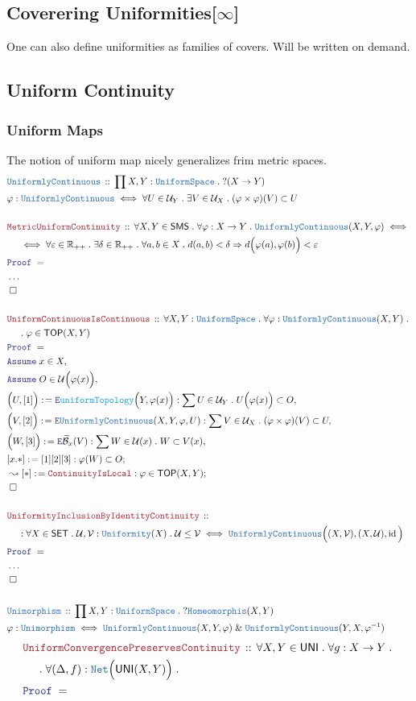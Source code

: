 \documentclass[12pt]{scrartcl}
\newcommand{\TYPE}[1]{\textcolor{NavyBlue}{\mathtt{#1}}}
\newcommand{\FUNC}[1]{\textcolor{Cerulean}{\mathtt{#1}}}
\newcommand{\LOGIC}[1]{\textcolor{Blue}{\mathtt{#1}}}
\newcommand{\THM}[1]{\textcolor{Maroon}{\mathtt{#1}}}
\renewcommand{\.}{\; . \;}
\newcommand{\de}{: \kern 0.1pc =}
\newcommand{\Theorem}[2]{& \THM{#1} \, :: \, #2 \\ & \Proof = \\ }
\newcommand{\DeclareType}[2]{& \TYPE{#1} \, :: \, #2 \\}
\newcommand{\DefineType}[3]{& #1 : \TYPE{#2} \iff #3 \\}
\newcommand{\NewLine}{\\ & \kern 1pc}
\newcommand{\Page}[1]{ \begin{align*} #1 \end{align*}   }
\newcommand{\NoProof}{ & \ldots \\ \EndProof}
\renewcommand{\And}{\; \& \;}
\newcommand{\Imply}{\Rightarrow}
\newcommand{\Reals}{\mathbb{R} }
\DeclareMathOperator*{\id}{id}
\newcommand{\Say}[3]{& #1 \de #2 : #3, \\}
\newcommand{\Conclude}[3]{& #1 \de #2 : #3; \\}
\newcommand{\DeriveConclude}[3]{& \leadsto #1 \de #2 : #3 ; \\}
\newcommand{\AssumeIn}[2]{& \LOGIC{Assume} \; #1 \in #2, \\}
\newcommand{\Elim}{\LOGIC{E}}
\newcommand{\QED}{\; \square}
\newcommand{\EndProof}{& \QED \\}
\newcommand{\Proof}{\LOGIC{Proof} \; }
\newcommand{\B}{\mathcal{B}}
\newcommand{\SET}{\mathsf{SET}}
\newcommand{\Net}{\TYPE{Net}}
\newcommand{\TOP}{\mathsf{TOP}}
\renewcommand{\U}{\mathcal{U}}
\newcommand{\SMS}{\mathsf{SMS}}
\newcommand{\UNI}{\mathsf{UNI}}
\newcommand{\Unif}{\TYPE{Uniformity}}
\newcommand{\US}{\TYPE{UniformSpace}}
\newcommand{\UC}{\TYPE{UniformlyContinuous}}
\newcommand{\UHomeo}{\TYPE{Unimorphism}}
\newcommand{\V}{\mathcal{V}}
\begin{document}
\subsection{Coverering Uniformities[$\infty$]}
One can also define uniformities as families of covers.
Will be written on demand.
\newpage
\subsection{Uniform Continuity}
\subsubsection{Uniform Maps}
The notion of uniform map nicely generalizes frim metric spaces.
\Page{
	\DeclareType{\UC}{\prod X,Y : \US \. ?(X \to Y)}
	\DefineType{\varphi}{\UC}{
		\forall U \in \U_Y \. 
		\exists V \in \U_X \.
		(\varphi \times \varphi)(V) \subset U 
	}
	\\
	\Theorem{MetricUniformContinuity}
	{
		\forall X,Y \in \SMS \.
		\forall \varphi : X \to Y \.
		\UC(X,Y,\varphi)
		\iff \NewLine \iff
		\forall \varepsilon \in \Reals_{++} \.
		\exists \delta \in \Reals_{++} \.
		\forall a,b \in X \.
		d(a,b) < \delta \Imply  d\Big( \varphi(a), \varphi(b)\Big) < \varepsilon  
	}
	\NoProof
	\\
	\Theorem{UniformContinuousIsContinuous}
	{
		\forall X,Y : \US \.
		\forall \varphi : \UC(X,Y) \. \NewLine \.
		\varphi \in \TOP(X,Y)
	}
	\AssumeIn{x}{X}
	\AssumeIn{O}{\U\Big( \varphi(x)\Big)}
	\Say{\Big(U,[1]\Big)}{\Elim \FUNC{uniformTopology}\Big(Y, \varphi(x)\Big)}
	{
		\sum U \in \U_Y \. U\Big( \varphi(x) \Big)  \subset O
	}
	\Say{\Big(V,[2]\Big)}{\Elim \UC(X,Y,\varphi,U) }
	{
		\sum V \in \U_X \. (\varphi \times \varphi)(V) \subset U
	}
	\Say{\Big(W,[3]\Big)}{\Elim \widetilde{\B}_x(V)}
	{
		\sum W \in \U(x) \.   W \subset V(x)
	}
	\Conclude{[x.*]}{[1][2][3]}{\varphi(W) \subset O}
	\DeriveConclude{[*]}{\THM{ContinuityIsLocal}}
	{
		\varphi \in \TOP(X,Y)	
	}
	\EndProof	
	\\
	\Theorem{UniformityInclusionByIdentityContinuity}
	{
		\NewLine :
		\forall X \in \SET \.
		\U,\V : \Unif(X)  \.
		\U \le \V
		\iff
		\UC\Big((X,\V),(X,\U),\id\Big)	
	}
	\NoProof
	\\
	\DeclareType{\UHomeo}{\prod X,Y : \US \. ?\TYPE{Homeomorphis}(X,Y)}
	\DefineType{\varphi}{\UHomeo}
	{
		\UC(X,Y,\varphi) \And \UC(Y,X,\varphi^{-1})
	}
}\Page{
	\Theorem{UniformConvergencePreservesContinuity}
	{
		\forall X,Y \in \UNI \.
		\forall g : X \to Y \. \NewLine \.
		\forall (\Delta,f) : \Net\Big( \UNI(X,Y)\Big) \.
}}
\end{document}
